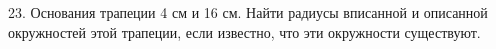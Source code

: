 23. Основания трапеции 4 см и 16 см. Найти радиусы вписанной и описанной окружностей этой трапеции, если известно, что эти окружности существуют.\\
